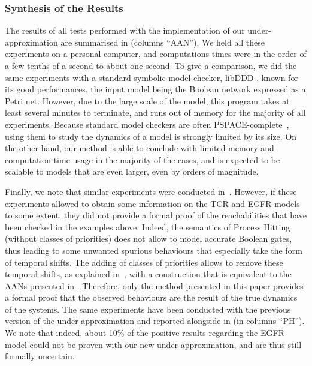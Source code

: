 \subsubsection*{Synthesis of the Results}

The results of all tests performed with the implementation of our under-approximation
are summarised in  (columns “AAN”).
We held all these experiments on a personal computer,
and computations times were in the order of a few tenths of a second to about one second.
To give a comparison, we did the same experiments with a standard symbolic model-checker, libDDD
\cite{libddd}, known for its good performances, the input model being the Boolean network expressed
as a Petri net.
However, due to the large scale of the model,
this program takes at least several minutes to terminate,
and runs out of memory for the majority of all experiments.
Because standard model checkers are often PSPACE-complete~\cite{Harel02},
using them to study the dynamics of a model is strongly limited by its size.
On the other hand,
our method is able to conclude with limited memory and computation time usage
in the majority of the cases,
and is expected to be scalable to models that are even larger,
even by orders of magnitude.

Finally, we note that similar experiments were conducted in~\cite{PMR12-MSCS}.
However, if these experiments allowed to obtain some information
on the TCR and EGFR models to some extent,
they did not provide a formal proof of the reachabilities that have been
checked in the examples above.
Indeed, the semantics of Process Hitting (without classes of priorities)
does not allow to model accurate Boolean gates,
thus leading to some unwanted spurious behaviours
that especially take the form of temporal shifts.
The adding of classes of priorities allows to remove these temporal shifts,
as explained in~\cite{FPMR13-CS2Bio},
with a construction that is equivalent to the AANs presented in .
Therefore, only the method presented in this paper provides a formal proof that
the observed behaviours are the result of the true dynamics of the systems.
The same experiments have been conducted with the previous version
of the under-approximation and reported alongside in 
(in columns “PH”).
We note that indeed, about 10\% of the positive results regarding the EGFR model
could not be proven with our new under-approximation,
and are thus still formally uncertain.

\newcommand{\grcl}{\cellcolor{lightgraycell}}

